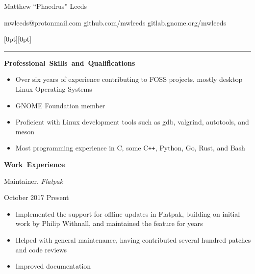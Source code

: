 \documentclass[11pt]{article}
\begin{document}
\centerline{\huge Matthew “Phaedrus” Leeds}
\vspace{0.4em}
\centerline{\normalsize mwleeds@protonmail.com \space \textbar \space github.com/mwleeds \space \textbar \space gitlab.gnome.org/mwleeds}

\noindent \begin{minipage}[t]{\textwidth}
\raisebox{9pt}[0pt][0pt]{\rule{\textwidth}{0.2mm}\hspace{-\textwidth}}
\end{minipage}

\vspace{0.8em}
\hbox{\large \textbf{Professional Skills and Qualifications}}

\begin{itemize}
  \item Over six years of experience contributing to FOSS projects, mostly desktop Linux Operating Systems
  \item GNOME Foundation member
  \item Proficient with Linux development tools such as gdb, valgrind, autotools, and meson
  \item Most programming experience in C, some C\texttt{++}, Python, Go, Rust, and Bash
\end{itemize}

\vspace{0.8em}
\hbox{\large \textbf{Work Experience}}

\begin{minipage}[t]{0.65\textwidth}
\flushleft
Maintainer, \textit{Flatpak}\\
\end{minipage}
\begin{minipage}[t]{0.30\textwidth}
\flushright
October 2017 \space \textemdash \space Present\\
\end{minipage}

\begin{itemize}
  \item Implemented the support for offline updates in Flatpak, building on initial work by Philip Withnall, and maintained the feature for years
  \item Helped with general maintenance, having contributed several hundred patches and code reviews
  \item Improved documentation
\end{itemize}
\end{document}
